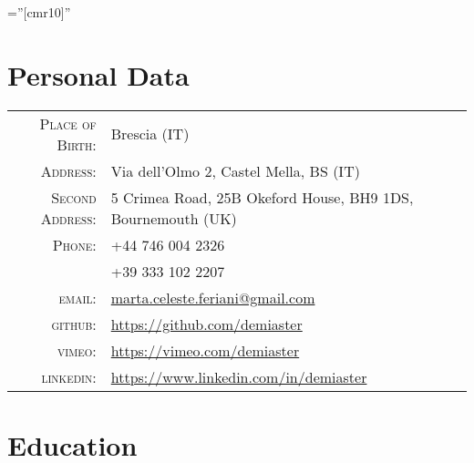 \documentclass[a4paper,10pt]{article} %
\begin{document}
\pagestyle{empty} %

\font\fb=''[cmr10]'' %


\par{\bigskip\par} %

\section{Personal Data}

\begin{tabular}{rl}
\textsc{Place of Birth:} & Brescia (IT) \\
\textsc{Address:} & Via dell'Olmo 2, Castel Mella, BS (IT) \\
\textsc{Second Address:} & 5 Crimea Road, 25B Okeford House, BH9 1DS, Bournemouth (UK)\\
\textsc{Phone:} & +44 746 004 2326 \\& +39 333 102 2207\\
\textsc{email:} & \href{mailto:marta.celeste.feriani@gmail.com}{marta.celeste.feriani@gmail.com}\\
\textsc{github:} & \href{https://github.com/demiaster}{https://github.com/demiaster}\\
\textsc{vimeo:} & \href{https://vimeo.com/demiaster}{https://vimeo.com/demiaster}\\
\textsc{linkedin:} & \href{https://www.linkedin.com/in/demiaster}{https://www.linkedin.com/in/demiaster}
\end{tabular}



\section{Education}
\end{document}
